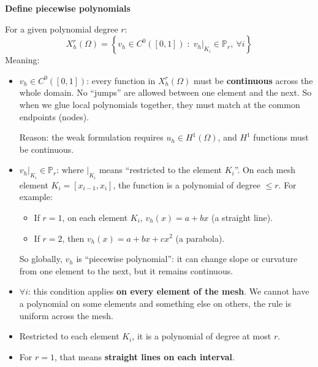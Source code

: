 \begin{flushleft}
    \textcolor{Green3}{ \textbf{Define piecewise polynomials}}
\end{flushleft}
For a given polynomial degree $r$:
\begin{equation}\label{eq: Poisson 1D - Enforce continuity}
    X_{h}^{r}\left(\Omega\right) = \left\{ v_{h} \in C^{0}\left(\left[0,1\right]\right) \; : \; v_{h}|_{K_{i}} \in \mathbb{P}_r, \ \forall i\right\}
\end{equation}
Meaning:
\begin{itemize}
    \item $v_h \in C^0([0,1])$: every function in $X_h^r(\Omega)$ must be \textbf{continuous} across the whole domain. No ``jumps'' are allowed between one element and the next. So when we glue local polynomials together, they must match at the common endpoints (nodes).

    Reason: the weak formulation requires $u_h \in H^{1}\left(\Omega\right)$, and $H^{1}$ functions must be continuous.
    \item $v_h|_{K_i} \in \mathbb{P}_r$: where $|_{K_i}$ means ``restricted to the element $K_i$''. On each mesh element $K_i = [x_{i-1}, x_i]$, the function is a polynomial of degree $\leq r$. For example:
    \begin{itemize}
        \item If $r=1$, on each element $K_i$, $v_h(x) = a + b x$ (a straight line).
        \item If $r=2$, then $v_h(x) = a + b x + c x^2$ (a parabola).
    \end{itemize}
    So globally, $v_{h}$ is ``piecewise polynomial'': it can change slope or curvature from one element to the next, but it remains continuous.
    \item $\forall i$: this condition applies \textbf{on every element of the mesh}. We cannot have a polynomial on some elements and something else on others, the rule is uniform across the mesh.
    \item Restricted to each element $K_i$, it is a polynomial of degree at most $r$.
    \item For $r=1$, that means \textbf{straight lines on each interval}.
\end{itemize}

